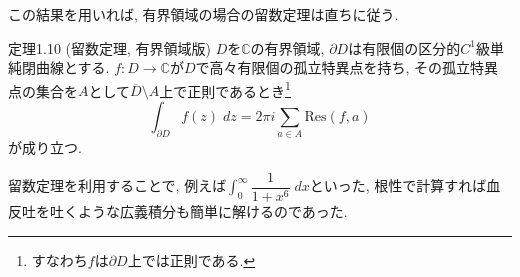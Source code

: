 \documentclass{jsarticle}
\newcommand{\C}{\mathbb{C}}%
\begin{document}
\vspace{1em}
この結果を用いれば, 有界領域の場合の留数定理は直ちに従う.

\begin{thm}{定理1.10 (留数定理, 有界領域版)}
$D$を$\C$の有界領域, $\partial D$は有限個の区分的$C^1$級単純閉曲線とする. $f\colon D\to \C$が$D$で高々有限個の孤立特異点を持ち, その孤立特異点の集合を$A$として$\overline{D}\setminus A$上で正則であるとき\footnote{すなわち$f$は$\partial D$上では正則である.}
\[
\int_{\partial D}f(z)\;dz = 2\pi i\sum_{a\in A} \text{Res}(f, a)
\]
が成り立つ.
\end{thm}

\vspace{1em}
留数定理を利用することで, 例えば$\displaystyle\int_{0}^{\infty} \dfrac{1}{1+x^6}\;dx$といった, 根性で計算すれば血反吐を吐くような広義積分も簡単に解けるのであった. 
\end{document}
